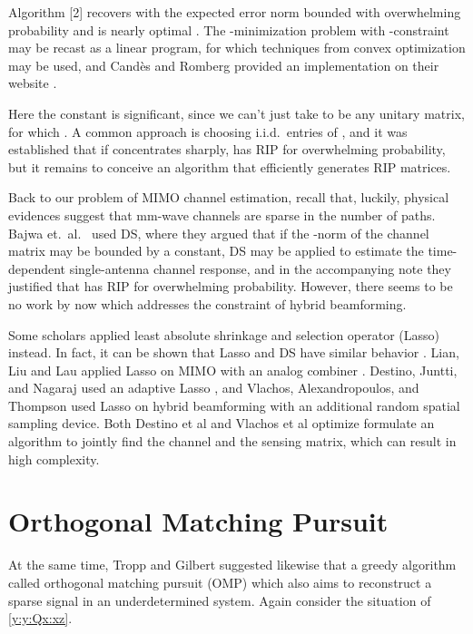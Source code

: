 Algorithm [2] recovers  with the expected error norm bounded with overwhelming probability and is nearly optimal \cite {CaT07}.
The -minimization problem with \m {\ell_\infty}-constraint may be recast as a linear program, for which techniques from convex optimization may be used, and Candès and Romberg provided an implementation on their website \cite {CaR05}.

Here the constant  is significant, since we can't just take  to be any unitary matrix, for which .
A common approach is choosing i.i.d.\ entries of , and it was established \cite {BDD08} that if  concentrates sharply,  has RIP for overwhelming probability, but it remains to conceive an algorithm that efficiently generates RIP matrices.

Back to our problem of MIMO channel estimation, recall that, luckily, physical evidences suggest that mm-wave channels are sparse in the number of paths.
Bajwa et.\ al.\ \cite {BHS10} used DS, where they argued that if the -norm of the channel matrix may be bounded by a constant, DS may be applied to estimate the time-dependent single-antenna channel response,
and in the accompanying note \cite {BHR08} they justified that  has RIP for overwhelming probability.
However, there seems to be no work by now which addresses the constraint of hybrid beamforming.

Some scholars applied least absolute shrinkage and selection operator (Lasso) instead.
In fact, it can be shown that Lasso and DS have similar behavior \cite {AsR10}.
Lian, Liu and Lau applied Lasso on MIMO with an analog combiner \cite {LLL17}.
Destino, Juntti, and Nagaraj used an adaptive Lasso \cite {DJN15}, and Vlachos, Alexandropoulos, and Thompson \cite {VAT19} used Lasso on hybrid beamforming with an additional random spatial sampling device.
Both Destino et al and Vlachos et al optimize formulate an algorithm to jointly find the channel and the sensing matrix, which can result in high complexity.

\section {Orthogonal Matching Pursuit}

At the same time, Tropp and Gilbert \cite {TrG07b} suggested likewise that a greedy algorithm called orthogonal matching pursuit (OMP) which also aims to reconstruct a sparse signal in an underdetermined system.
Again consider the situation of \eqref {y:y:Qx:xz}.

